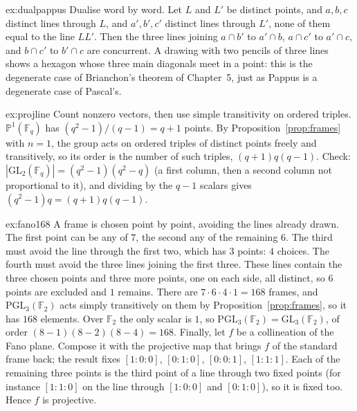 \begin{solution}{ex:dualpappus}
\idea Dualise word by word.
\writeup Let $L$ and $L'$ be distinct points, and $a,b,c$ distinct lines through $L$, and $a',b',c'$ distinct lines through $L'$, none of them
equal to the line $LL'$. Then the three lines joining $a\cap b'$ to $a'\cap b$, $a\cap c'$ to $a'\cap c$, and $b\cap c'$ to $b'\cap c$ are
concurrent. A drawing with two pencils of three lines shows a hexagon whose three main diagonals meet in a point: this is the degenerate case of
Brianchon's theorem of Chapter~5, just as Pappus is a degenerate case of Pascal's.
\end{solution}

\begin{solution}{ex:projline}
\idea Count nonzero vectors, then use simple transitivity on ordered triples.
\writeup $\mathbb P^1(\mathbb F_q)$ has $(q^2-1)/(q-1)=q+1$ points. By Proposition~\ref{prop:frames} with $n=1$, the group acts on ordered triples of
distinct points freely and transitively, so its order is the number of such triples, $(q+1)q(q-1)$. Check:
$|\mathrm{GL}_2(\mathbb F_q)|=(q^2-1)(q^2-q)$ (a first column, then a second column not proportional to it), and dividing by the $q-1$ scalars
gives $(q^2-1)q=(q+1)q(q-1)$.
\end{solution}

\begin{solution}{ex:fano168}
\idea A frame is chosen point by point, avoiding the lines already drawn.
\writeup The first point can be any of $7$, the second any of the remaining $6$. The third must avoid the line through the first two, which has
$3$ points: $4$ choices. The fourth must avoid the three lines joining the first three. These lines contain the three chosen points and
three more points, one on each side, all distinct, so $6$ points are excluded and $1$ remains. There are $7\cdot6\cdot4\cdot1=168$ frames, and
$\mathrm{PGL}_3(\mathbb F_2)$ acts simply transitively on them by Proposition~\ref{prop:frames}, so it has $168$ elements. Over $\mathbb F_2$
the only scalar is $1$, so $\mathrm{PGL}_3(\mathbb F_2)=\mathrm{GL}_3(\mathbb F_2)$, of order $(8-1)(8-2)(8-4)=168$. Finally, let $f$ be a
collineation of the Fano plane. Compose it with the projective map that brings $f$ of the standard frame back; the result fixes $[1:0:0]$,
$[0:1:0]$, $[0:0:1]$, $[1:1:1]$. Each of the remaining three points is the third point of a line through two fixed points (for instance
$[1:1:0]$ on the line through $[1:0:0]$ and $[0:1:0]$), so it is fixed too. Hence $f$ is projective.
\end{solution}

